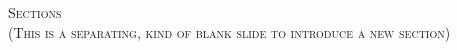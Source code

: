 \miniframesoff

\begin{frame}{}

  \centering
  {\LARGE\textsc{Sections\\\vspace{0.2cm}\tiny{(This is a separating, kind of blank slide to introduce a new section)}}}
  
\end{frame}
  
\miniframeson
